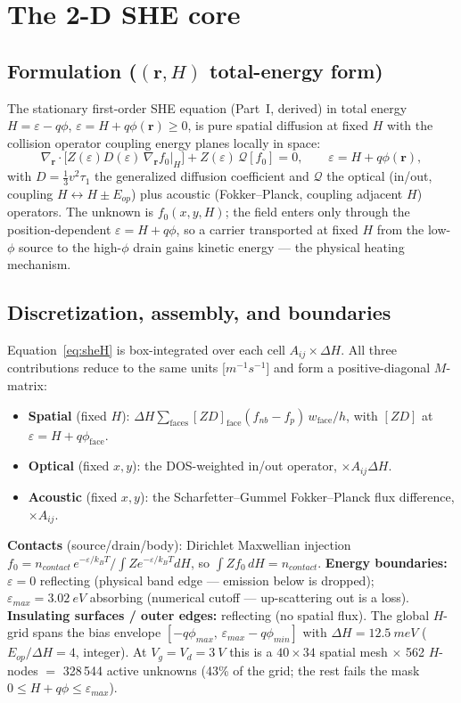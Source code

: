 \documentclass[11pt]{article}
\newcommand{\eps}{\varepsilon}
\newcommand{\vecr}{\mathbf{r}}
\newcommand{\gradr}{\nabla_{\!\vecr}}
\begin{document}
\section{The 2-D SHE core}

\subsection{Formulation ($(\vecr,H)$ total-energy form)}
The stationary first-order SHE equation (Part~I, derived) in total energy $H=\eps-q\phi$,
$\eps=H+q\phi(\vecr)\ge0$, is pure spatial diffusion at fixed $H$ with the collision
operator coupling energy planes locally in space:
\begin{equation}
\gradr\!\cdot\!\big[Z(\eps)D(\eps)\,\gradr f_0|_H\big] + Z(\eps)\,\mathcal{Q}[f_0] = 0,
\qquad \eps = H + q\phi(\vecr),
\label{eq:sheH}
\end{equation}
with $D=\tfrac13 v^2\tau_1$ the generalized diffusion coefficient and $\mathcal{Q}$ the
optical (in/out, coupling $H\!\leftrightarrow\!H\pm E_{op}$) plus acoustic (Fokker--Planck,
coupling adjacent $H$) operators. The unknown is $f_0(x,y,H)$; the field enters only through
the position-dependent $\eps=H+q\phi$, so a carrier transported at fixed $H$ from the
low-$\phi$ source to the high-$\phi$ drain gains kinetic energy --- the physical heating
mechanism.

\subsection{Discretization, assembly, and boundaries}
Equation~\eqref{eq:sheH} is box-integrated over each cell $A_{ij}\times\Delta H$. All three
contributions reduce to the same units [$\si{m^{-1}s^{-1}}$] and form a positive-diagonal
$M$-matrix:
\begin{itemize}[leftmargin=1.4em,itemsep=1pt]
\item \textbf{Spatial} (fixed $H$): $\Delta H\sum_{\text{faces}}[ZD]_{\text{face}}(f_{nb}-f_p)
\,w_{\text{face}}/h$, with $[ZD]$ at $\eps=H+q\phi_{\text{face}}$.
\item \textbf{Optical} (fixed $x,y$): the DOS-weighted in/out operator, $\times A_{ij}\Delta H$.
\item \textbf{Acoustic} (fixed $x,y$): the Scharfetter--Gummel Fokker--Planck flux difference,
$\times A_{ij}$.
\end{itemize}
\textbf{Contacts} (source/drain/body): Dirichlet Maxwellian injection
$f_0=n_{contact}\,e^{-\eps/k_BT}/\!\int Z e^{-\eps/k_BT}dH$, so $\int Zf_0\,dH=n_{contact}$.
\textbf{Energy boundaries:} $\eps=0$ reflecting (physical band edge --- emission below is
dropped); $\eps_{max}=\SI{3.02}{eV}$ absorbing (numerical cutoff --- up-scattering out is a
loss). \textbf{Insulating surfaces / outer edges:} reflecting (no spatial flux). The global
$H$-grid spans the bias envelope $[-q\phi_{max},\,\eps_{max}-q\phi_{min}]$ with
$\Delta H=\SI{12.5}{meV}$ ($E_{op}/\Delta H=4$, integer). At $V_g=V_d=\SI{3}{V}$ this is a
$40\times34$ spatial mesh $\times$ 562 $H$-nodes $=$ 328\,544 active unknowns (43\% of the
grid; the rest fails the mask $0\le H+q\phi\le\eps_{max}$).
\end{document}
